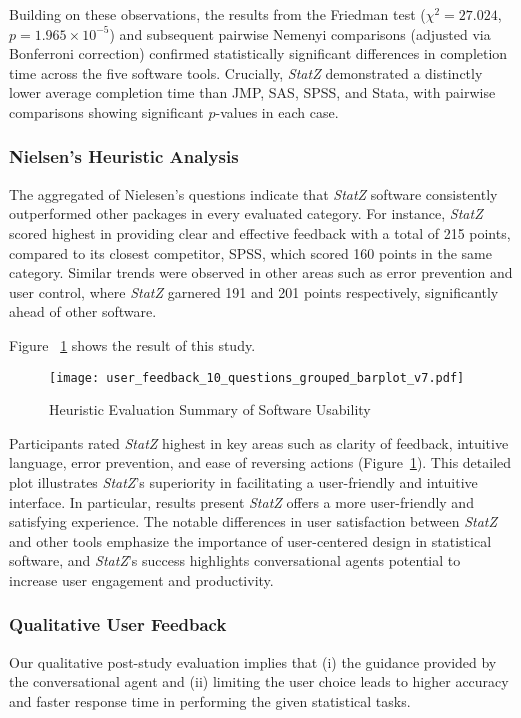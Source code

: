 \documentclass{article}
\begin{document}
Building on these observations, the results from the Friedman test (\(\chi^2 = 27.024\), \(p = 1.965 \times 10^{-5}\)) and subsequent pairwise Nemenyi comparisons (adjusted via Bonferroni correction) confirmed statistically significant differences in completion time across the five software tools. Crucially, \textit{StatZ} demonstrated a distinctly lower average completion time than JMP, SAS, SPSS, and Stata, with pairwise comparisons showing significant \(p\)-values in each case. 

\subsubsection{Nielsen's Heuristic Analysis}

The aggregated of Nielesen's questions indicate that \textit{StatZ} software consistently outperformed other packages in every evaluated category. For instance, \textit{StatZ} scored highest in providing clear and effective feedback with a total of 215 points, compared to its closest competitor, SPSS, which scored 160 points in the same category. Similar trends were observed in other areas such as error prevention and user control, where \textit{StatZ} garnered 191 and 201 points respectively, significantly ahead of other software.

Figure ~\ref{fig:userfeedback} shows the result of this study. 
\begin{figure}[htbp]
  \centering
  \texttt{[image: user\_feedback\_10\_questions\_grouped\_barplot\_v7.pdf]}
  \caption{Heuristic Evaluation Summary of Software Usability}
 \label{fig:userfeedback}
\end{figure}
Participants rated \textit{StatZ} highest in key areas such as clarity of feedback, intuitive language, error prevention, and ease of reversing actions (Figure~\ref{fig:userfeedback}). This detailed plot illustrates \textit{StatZ}'s superiority in facilitating a user-friendly and intuitive interface. In particular,  results present \textit{StatZ} offers a more user-friendly and satisfying experience. The notable differences in user satisfaction between \textit{StatZ} and other tools emphasize the importance of user-centered design in statistical software, and \textit{StatZ}'s success highlights conversational agents potential to increase user engagement and productivity.

\subsubsection{Qualitative User Feedback}
Our qualitative post-study evaluation implies that (i) the guidance provided by the conversational agent and (ii) limiting the user choice leads to higher accuracy and faster response time in performing the given statistical tasks.
\end{document}
